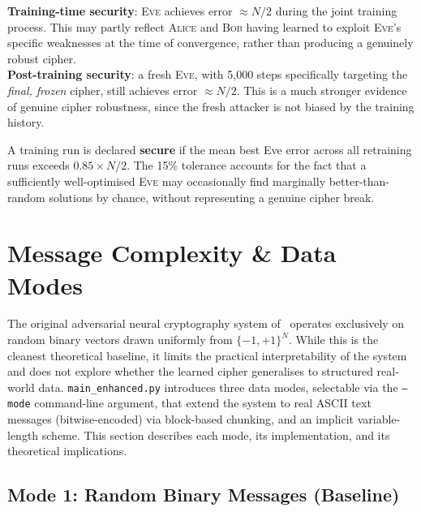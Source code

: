 \documentclass[12pt, a4paper]{article}
\newcommand{\alice}{\textsc{Alice}}
\newcommand{\bob}{\textsc{Bob}}
\newcommand{\eve}{\textsc{Eve}}
\newcommand{\code}[1]{\texttt{\color{CodeRed}#1}}
\begin{document}
\begin{tcolorbox}[contribbox, title={Training-Time vs.\ Post-Training Security}]
  \textbf{Training-time security}: \eve{} achieves error $\approx N/2$
  during the joint training process. This may partly reflect \alice{}
  and \bob{} having learned to exploit \eve{}'s specific weaknesses
  at the time of convergence, rather than producing a genuinely
  robust cipher.\\[6pt]
  \textbf{Post-training security}: a fresh \eve{}, with 5{,}000 steps
  specifically targeting the \emph{final, frozen} cipher, still
  achieves error $\approx N/2$. This is a much stronger evidence
  of genuine cipher robustness, since the fresh attacker is not
  biased by the training history.
\end{tcolorbox}

A training run is declared \textbf{secure} if the mean best Eve error
across all retraining runs exceeds $0.85 \times N/2$. The 15\% tolerance
accounts for the fact that a sufficiently well-optimised \eve{} may
occasionally find marginally better-than-random solutions by chance,
without representing a genuine cipher break.

\newpage
\section{Message Complexity \& Data Modes}
\label{sec:message_modes}

The original adversarial neural cryptography system of~\cite{abadi2016learning}
operates exclusively on random binary vectors drawn uniformly from
$\{-1,+1\}^N$. While this is the cleanest theoretical baseline, it
limits the practical interpretability of the system and does not explore
whether the learned cipher generalises to structured real-world data.
\code{main\_enhanced.py} introduces three data modes, selectable via the
\code{--mode} command-line argument, that extend the system to real
ASCII text messages (bitwise-encoded) via block-based chunking,
and an implicit variable-length scheme. This section describes each
mode, its implementation, and its theoretical implications.

\subsection{Mode 1: Random Binary Messages (Baseline)}
\label{subsec:mode_random}
\end{document}
